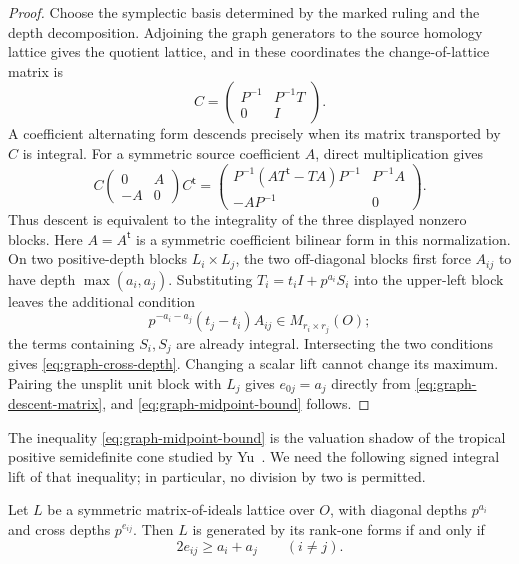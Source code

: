 \begin{proof}
Choose the symplectic basis determined by the marked ruling and the depth
decomposition.  Adjoining the graph generators to the source homology
lattice gives the quotient lattice, and in these coordinates the
change-of-lattice matrix is
\[
 C=\begin{pmatrix}P^{-1}&P^{-1}T\\0&I\end{pmatrix}.
\]
A coefficient alternating form descends precisely when its matrix transported
by \(C\) is integral.  For a symmetric source coefficient \(A\), direct
multiplication gives
\[
 C\begin{pmatrix}0&A\\-A&0\end{pmatrix}C^{\mathsf t}
 =
 \begin{pmatrix}
 P^{-1}(AT^{\mathsf t}-TA)P^{-1}&P^{-1}A\\
 -AP^{-1}&0
 \end{pmatrix}.
 \tag{3.7}
 \label{eq:graph-descent-matrix}
\]
Thus descent is equivalent to the integrality of the three displayed
nonzero blocks.  Here \(A=A^{\mathsf t}\) is a symmetric coefficient
bilinear form in this normalization.  On two positive-depth blocks
\(L_i\times L_j\), the two off-diagonal blocks first
force \(A_{ij}\) to have depth \(\max(a_i,a_j)\).  Substituting
\(T_i=t_iI+p^{a_i}S_i\) into the upper-left block leaves the additional
condition
\[
 p^{-a_i-a_j}(t_j-t_i)A_{ij}\in M_{r_i\times r_j}(O);
\]
the terms containing \(S_i,S_j\) are already integral.  Intersecting the two
conditions gives \eqref{eq:graph-cross-depth}.  Changing a scalar lift cannot
change its maximum.
Pairing the unsplit unit block with \(L_j\) gives \(e_{0j}=a_j\) directly
from \eqref{eq:graph-descent-matrix}, and
\eqref{eq:graph-midpoint-bound} follows.
\end{proof}

The inequality \eqref{eq:graph-midpoint-bound} is the valuation shadow of the tropical positive
semidefinite cone studied by Yu~\cite{YuTropical}.  We need the following
signed integral lift of that inequality; in particular, no division by two
is permitted.

\begin{lemma}
\label{lem:dvr-rank-one}
%
%
Let \(L\) be a symmetric matrix-of-ideals lattice over \(O\), with diagonal
depths \(p^{a_i}\) and cross depths \(p^{e_{ij}}\).  Then \(L\) is generated
by its rank-one forms if and only if
\[
 2e_{ij}\geq a_i+a_j\qquad(i\ne j).
 \tag{3.8}
\]
\end{lemma}

